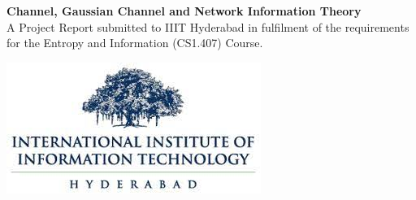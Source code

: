 \begin{center}
	{\huge \textbf{Channel, Gaussian Channel and Network Information Theory}}\\
	A Project Report submitted to IIIT Hyderabad in fulfilment of the requirements for the Entropy and Information (CS1.407) Course.
	\vspace{1em}
\end{center}

\vspace{1em}

\begin{center}
	\includegraphics[scale=0.5]{iiit.jpeg}
\end{center} 
%
